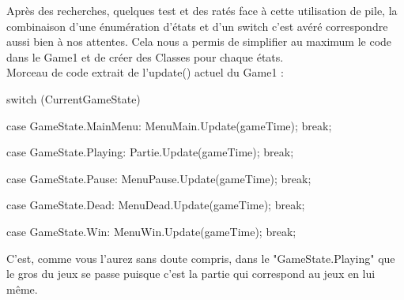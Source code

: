 \documentclass [11pt]{report}
\begin{document}
	Après des recherches, quelques test et des ratés face à cette utilisation de pile, la combinaison d'une énumération d'états et d'un switch c'est avéré correspondre aussi bien à nos attentes. Cela nous a permis de simplifier au maximum le code dans le Game1 et de créer des Classes pour chaque états.\\
			
	\noindent Morceau de code extrait de l'update() actuel du Game1 :
	
	
	\begin{mylisting}
			
	switch (CurrentGameState)
	{
		case GameState.MainMenu:
			MenuMain.Update(gameTime);
			break;
			
		case GameState.Playing:
			Partie.Update(gameTime);
			break;
			
		case GameState.Pause:
			MenuPause.Update(gameTime);
			break;
			
		case GameState.Dead:
			MenuDead.Update(gameTime);		
			break;
			
		case GameState.Win:
			MenuWin.Update(gameTime);
			break;
	}
			\end{mylisting}
	
	\vspace{10mm}
	
	C'est, comme vous l'aurez sans doute compris, dans le "GameState.Playing" que le gros du jeux se passe puisque c'est la partie qui correspond au jeux en lui même.
	
	
	\vspace{10mm}
	\newpage
	
\end{document}

